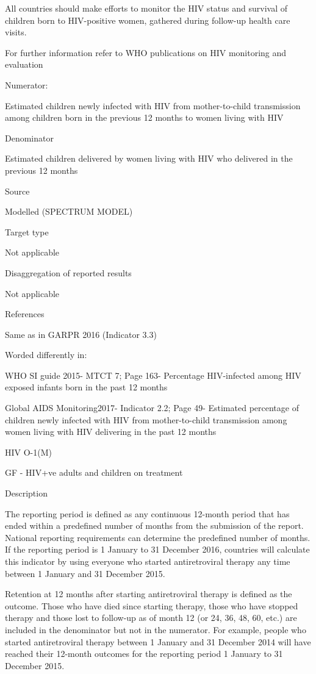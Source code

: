 \documentclass[]{book}
\begin{document}
All countries should make efforts to monitor the HIV status and survival of children born to HIV-positive women, gathered during follow-up health care visits.

For further information refer to WHO publications on HIV monitoring and evaluation

Numerator:

Estimated children newly infected with HIV from mother-to-child transmission among children born in the previous 12 months to women living with HIV

Denominator

Estimated children delivered by women living with HIV who delivered in the previous 12 months

Source

Modelled (SPECTRUM MODEL)

Target type

Not applicable

Disaggregation of reported results

Not applicable

References

Same as in GARPR 2016 (Indicator 3.3)

Worded differently in:

WHO SI guide 2015- MTCT 7; Page 163- Percentage HIV-infected among HIV exposed infants born in the past 12 months

Global AIDS Monitoring2017- Indicator 2.2; Page 49- Estimated percentage of children newly infected with HIV from mother-to-child transmission among women living with HIV delivering in the past 12 months

HIV O-1(M)

GF - HIV+ve adults and children on treatment

Description

The reporting period is defined as any continuous 12-month period that has ended within a predefined number of months from the submission of the report. National reporting requirements can determine the predefined number of months. If the reporting period is 1 January to 31 December 2016, countries will calculate this indicator by using everyone who started antiretroviral therapy any time between 1 January and 31 December 2015.

Retention at 12 months after starting antiretroviral therapy is defined as the outcome. Those who have died since starting therapy, those who have stopped therapy and those lost to follow-up as of month 12 (or 24, 36, 48, 60, etc.) are included in the denominator but not in the numerator. For example, people who started antiretroviral therapy between 1 January and 31 December 2014 will have reached their 12-month outcomes for the reporting period 1 January to 31 December 2015.
\end{document}
